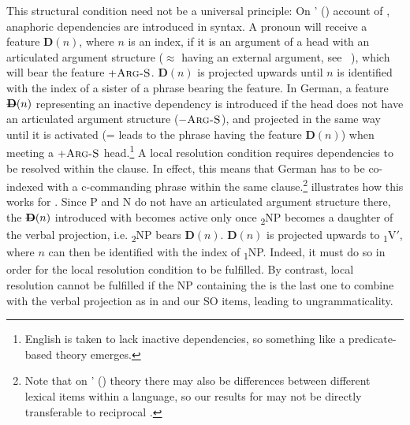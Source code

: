 \documentclass[output=paper,colorlinks,citecolor=brown]{langscibook}
\begin{document}
This structural condition need not be a universal principle: 
On \citeauthor{kiss_reflexivity_2012}' (\citeyear{kiss_reflexivity_2012}) account of  , anaphoric dependencies are introduced in syntax.
A  pronoun will receive a feature $\mathbf{D}(n)$, where $n$ is an index, if it is an argument of a head with an articulated argument structure ($\approx$ having an external argument, see \citeauthor{kiss_reflexivity_2012}~\citeyear{kiss_reflexivity_2012}), which will bear the feature $+\textsc{Arg-S}$.
$\mathbf{D}(n)$ is projected upwards until $n$ is identified with the index of a sister of a phrase bearing the feature.
In German, a feature $\msout{\mathbf{D}}(n)$ representing an inactive dependency is introduced if the head does not have an articulated argument structure ($-\textsc{Arg-S}$), and projected in the same way until it is activated (= leads to the phrase having the feature $\mathbf{D}(n)$) when meeting a $+\textsc{Arg-S}$ head.\footnote{English is taken to lack inactive dependencies, so something like a predicate-based  theory emerges.}
A local resolution condition requires dependencies to be resolved within the clause.
In effect, this means that German  has to be co-indexed with a c-commanding phrase within the same clause.\footnote{Note that on \citeauthor{kiss_reflexivity_2012}' (\citeyear{kiss_reflexivity_2012}) theory there may also be differences between different lexical items within a language, so our results for  may not be directly transferable to reciprocal .}
 illustrates how this works for .
Since P and N do not have an articulated argument structure there, the $\msout{\mathbf{D}}(n)$ introduced with  becomes active only once \textsubscript{2}NP%
becomes a daughter of the verbal projection, i.e. \textsubscript{2}NP bears $\mathbf{D}(n)$.
$\mathbf{D}(n)$ is projected upwards to \textsubscript{1}V$'$, where $n$ can then be identified with the index of \textsubscript{1}NP. 
Indeed, it must do so in order for the local resolution condition to be fulfilled.
By contrast, local resolution cannot be fulfilled if the NP containing the  is the last one to combine with the verbal projection as in  and our SO items, leading to ungrammaticality.
\end{document}
